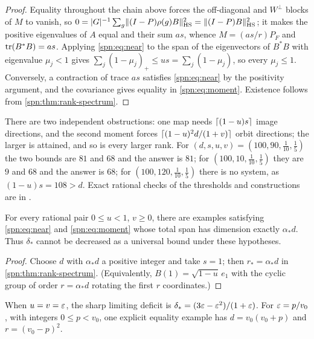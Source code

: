 \begin{proof}
Equality throughout the chain above forces the off-diagonal and $W^\perp$ blocks of $M$ to vanish, so
$0=\lvert G\rvert^{-1}\sum_g\lVert(I-P)\rho(g)B\rVert_{\mathrm{HS}}^2=\lVert(I-P)B\rVert_{\mathrm{HS}}^2$; it makes the positive
eigenvalues of $A$ equal and their sum $as$, whence $M=(as/r)P_F$ and $\operatorname{tr}(B^*B)=as$. Applying
\eqref{spn:eq:near} to the span of the eigenvectors of $B^*B$ with eigenvalue $\mu_j<1$ gives
$\sum_j(1-\mu_j)_+\le us=\sum_j(1-\mu_j)$, so every $\mu_j\le1$. Conversely, a contraction of trace
$as$ satisfies \eqref{spn:eq:near} by the positivity argument, and the covariance gives equality in
\eqref{spn:eq:moment}. Existence follows from \cref{spn:thm:rank-spectrum}.
\end{proof}

There are two independent obstructions: one map needs $\lceil(1-u)s\rceil$ image directions, and the
second moment forces $\lceil(1-u)^2d/(1+v)\rceil$ orbit directions; the larger is attained, and so is every
larger rank. For $(d,s,u,v)=(100,90,\tfrac1{10},\tfrac15)$ the two bounds are $81$ and $68$ and the
answer is $81$; for $(100,10,\tfrac1{10},\tfrac15)$ they are $9$ and $68$ and the answer is $68$; for
$(100,120,\tfrac1{10},\tfrac15)$ there is no system, as $(1-u)s=108>d$. Exact rational checks of the
thresholds and constructions are in
.

\begin{corollary}\label{spn:prop:sharp}
For every rational pair $0\le u<1$, $v\ge0$, there are examples satisfying
\eqref{spn:eq:near} and \eqref{spn:eq:moment} whose total span has dimension
exactly $\alpha_*d$. Thus $\delta_*$ cannot be decreased as a universal bound
under these hypotheses.
\end{corollary}

\begin{proof}
Choose $d$ with $\alpha_*d$ a positive integer and take $s=1$; then $r_*=\alpha_*d$ in
\cref{spn:thm:rank-spectrum}. (Equivalently, $B(1)=\sqrt{1-u}\,e_1$ with the cyclic group of order
$r=\alpha_*d$ rotating the first $r$ coordinates.)
\end{proof}

\begin{corollary}\label{spn:cor:equal}
When $u=v=\varepsilon$, the sharp limiting deficit is
$\delta_*=(3\varepsilon-\varepsilon^2)/(1+\varepsilon)$. For $\varepsilon=p/v_0$, with integers
$0\le p<v_0$, one explicit equality example has $d=v_0(v_0+p)$ and
$r=(v_0-p)^2$.
\end{corollary}

